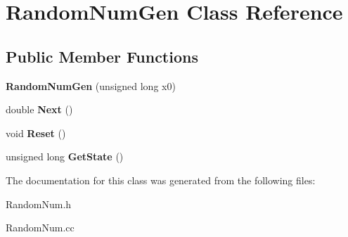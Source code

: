 \hypertarget{class_random_num_gen}{\section{Random\-Num\-Gen Class Reference}
\label{class_random_num_gen}
}
\subsection*{Public Member Functions}
\begin{DoxyCompactItemize}
\item 
\hypertarget{class_random_num_gen_ac98ff22efa3b9c23e6b6ba1cf6a6097f}{{\bfseries Random\-Num\-Gen} (unsigned long x0)}\label{class_random_num_gen_ac98ff22efa3b9c23e6b6ba1cf6a6097f}

\item 
\hypertarget{class_random_num_gen_a49782fde536ad4b01ab3bd6063a5c6c2}{double {\bfseries Next} ()}\label{class_random_num_gen_a49782fde536ad4b01ab3bd6063a5c6c2}

\item 
\hypertarget{class_random_num_gen_a12e515fdf02cd66772a76ae0765d4d08}{void {\bfseries Reset} ()}\label{class_random_num_gen_a12e515fdf02cd66772a76ae0765d4d08}

\item 
\hypertarget{class_random_num_gen_a936200dd149f676875efaa2dbed8699e}{unsigned long {\bfseries Get\-State} ()}\label{class_random_num_gen_a936200dd149f676875efaa2dbed8699e}

\end{DoxyCompactItemize}


The documentation for this class was generated from the following files\-:\begin{DoxyCompactItemize}
\item 
Random\-Num.\-h\item 
Random\-Num.\-cc\end{DoxyCompactItemize}
